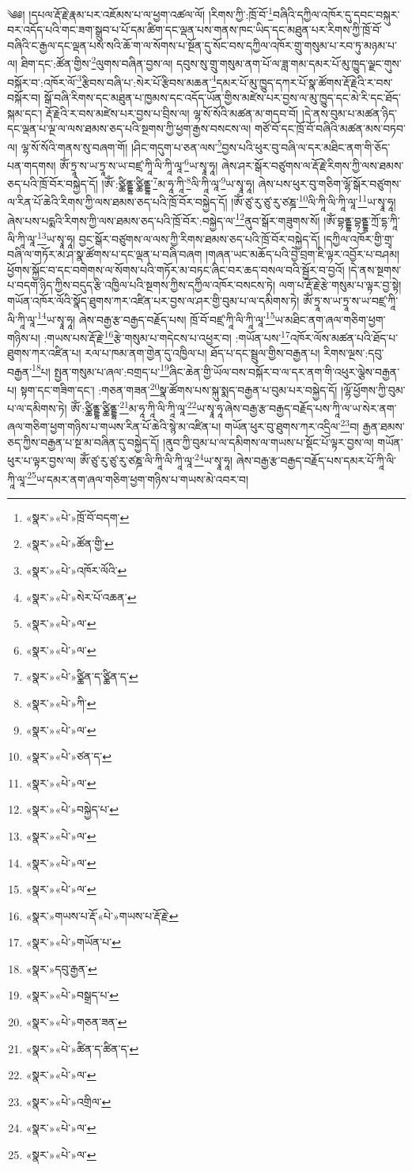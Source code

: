༄༅། །དཔལ་རྡོ་རྗེ་རྣམ་པར་འཇོམས་པ་ལ་ཕྱག་འཚལ་ལོ། །རིགས་ཀྱི་:ཁྲོ་བོ་\footnote{«སྣར་»«པེ་»ཁྲོ་བོ་བདག་}བཞིའི་དཀྱིལ་འཁོར་དུ་དབང་བསྐུར་བར་འདོད་པའི་གང་ཟག་སྒྲུབ་པ་པོ་དམ་ཚིག་དང་ལྡན་པས་གནས་ཁང་ཡིད་དང་མཐུན་པར་རིགས་ཀྱི་ཁྲོ་བོ་བཞིའི་ང་རྒྱལ་དང་ལྡན་པས་སའི་ཆོ་ག་ལ་སོགས་པ་སྔོན་དུ་སོང་བས་དཀྱིལ་འཁོར་གྲུ་གསུམ་པ་རབ་ཏུ་མཉམ་པ་ལ། ཐིག་དང་:ཚོན་གྱིས་\footnote{«སྣར་»«པེ་»ཚོན་གྱི་}ལུགས་བཞིན་བྱས་ལ། དབུས་སུ་གྲུ་གསུམ་ནག་པོ་ལ་ཟླ་གམ་དམར་པོ་མུ་ཁྱུད་ལྗང་གུས་བསྐོར་བ་:འཁོར་ལོ་\footnote{«སྣར་»«པེ་»འཁོར་ལོའི་}རྩིབས་བཞི་པ་:སེར་པོ་རྩིབས་མཆན་\footnote{«སྣར་»«པེ་»སེར་པོ་འཆན་}དམར་པོ་མུ་ཁྱུད་དཀར་པོ་སྣ་ཚོགས་རྡོ་རྗེའི་ར་བས་བསྐོར་བ། སྒོ་བཞི་རིགས་དང་མཐུན་པ་ཁྱམས་དང་འདོད་ཡོན་གྱིས་མཛེས་པར་བྱས་ལ་མུ་ཁྱུད་དང་མེ་རི་དང་ཐོད་སྐམ་དང་། རྡོ་རྗེའི་ར་བས་མཛེས་པར་བྱས་པ་བྲིས་ལ། ལྷ་སོ་སོའི་མཚན་མ་གདབ་བོ། །དེ་ནས་བུམ་པ་མཚན་ཉིད་དང་ལྡན་པ་ལྔ་ལ་ལས་ཐམས་ཅད་པའི་སྔགས་ཀྱི་ཕྱག་རྒྱས་བསངས་ལ། གཙོ་བོ་དང་ཁྲོ་བོ་བཞིའི་མཚན་མས་བཏབ་ལ། ལྷ་སོ་སོའི་གནས་སུ་བཞག་གོ། །ཤིང་གདུག་པ་ཅན་ལས་\footnote{«སྣར་»«པེ་»ལ་}བྱས་པའི་ཕུར་བུ་བཞི་ལ་དར་མཐིང་ནག་གི་ཅོད་པན་གདགས། ཨོཾ་ཏྲཱ་ས་ཡ་ཏྲཱ་ས་ཡ་བཛྲ་ཀཱི་ལི་ཀཱི་ལཱ་\footnote{«སྣར་»«པེ་»ལ་}ཡ་སྭཱ་ཧཱ། ཞེས་ཤར་སྒོར་བཙུགས་ལ་རྡོ་རྗེ་རིགས་ཀྱི་ལས་ཐམས་ཅད་པའི་ཁྲོ་བོར་བསྐྱེད་དོ། །ཨོཾ་:ཙྪིནྡྷ་ཙྪིནྡྷ་\footnote{«སྣར་»«པེ་»ཙྪིན་ད་ཙྪིན་ད་}མ་ཧཱ་ཀཱི་\footnote{«སྣར་»«པེ་»ཀི་}ལི་ཀཱི་ལཱ་\footnote{«སྣར་»«པེ་»ལ་}ཡ་སྭཱ་ཧཱ། ཞེས་པས་ཕུར་བུ་གཅིག་ལྷོ་སྒོར་བཙུགས་ལ་རིན་པོ་ཆེའི་རིགས་ཀྱི་ལས་ཐམས་ཅད་པའི་ཁྲོ་བོར་བསྐྱེད་དོ། །ཨོཾ་ཙུ་རུ་ཙུ་རུ་ཙཎྜ་\footnote{«སྣར་»«པེ་»ཙན་ད་}ལི་ཀཱི་ལི་ཀཱི་ལཱ་\footnote{«སྣར་»«པེ་»ལ་}ཡ་སྭཱ་ཧཱ། ཞེས་པས་པདྨའི་རིགས་ཀྱི་ལས་ཐམས་ཅད་པའི་ཁྲོ་བོར་:བསྐྱེད་ལ་\footnote{«སྣར་»«པེ་»བསྐྱེད་པ་}ནུབ་སྒོར་གཟུགས་སོ། །ཨོཾ་བྷནྡྷ་བྷནྡྷ་ཀྲོ་དྷ་ཀཱི་ལི་ཀཱི་ལཱ་\footnote{«སྣར་»«པེ་»ལ་}ཡ་སྭཱ་ཧཱ། བྱང་སྒོར་བཙུགས་ལ་ལས་ཀྱི་རིགས་ཐམས་ཅད་པའི་ཁྲོ་བོར་བསྐྱེད་དོ། །དཀྱིལ་འཁོར་གྱི་གྲྭ་བཞི་ལ་གཏོར་མ་ཤ་སྣ་ཚོགས་པ་དང་ལྡན་པ་བཞི་བཞག །གཞན་ཡང་མཆོད་པའི་བྱེ་བྲག་ཇི་ལྟར་འབྱོར་པ་བཤམ། ཕྱོགས་སྐྱོང་བ་དང་བགེགས་ལ་སོགས་པའི་གཏོར་མ་བཏང་ཞིང་བར་ཆད་བསལ་བའི་སྦྱོར་བ་བྱའོ། །དེ་ནས་སྔགས་པ་བདག་ཉིད་ཀྱིས་བདུད་རྩི་འཁྱིལ་པའི་སྔགས་ཀྱིས་དཀྱིལ་འཁོར་བསངས་ཏེ། ལག་པ་རྡོ་རྗེ་རྩེ་གསུམ་པ་ལྟར་བྱ་སྟེ། གཡོན་འཁོར་ལོའི་སྣོད་ཐུགས་ཀར་འཛིན་པར་བྱས་ལ་ཤར་གྱི་བུམ་པ་ལ་དམིགས་ཏེ། ཨོཾ་ཏྲཱ་ས་ཡ་ཏྲཱ་ས་ཡ་བཛྲ་ཀཱི་ལི་ཀཱི་ལཱ་\footnote{«སྣར་»«པེ་»ལ་}ཡ་སྭཱ་ཧཱ། ཞེས་བརྒྱ་རྩ་བརྒྱད་བརྗོད་པས། ཁྲོ་བོ་བཛྲ་ཀཱི་ལི་ཀཱི་ལཱ་\footnote{«སྣར་»«པེ་»ལ་}ཡ་མཐིང་ནག་ཞལ་གཅིག་ཕྱག་གཉིས་པ། :གཡས་པས་རྡོ་རྗེ་\footnote{«སྣར་»གཡས་པ་རྡོ་«པེ་»གཡས་པ་རྡོ་རྗེ་}རྩེ་གསུམ་པ་གདེངས་པ་འཕྱར་བ། :གཡོན་པས་\footnote{«སྣར་»«པེ་»གཡོན་པ་}འཁོར་ལོས་མཚན་པའི་ཐོད་པ་ཐུགས་ཀར་འཛིན་པ། རལ་པ་ཁམ་ནག་གྱེན་དུ་འཁྱིལ་པ། ཐོད་པ་དང་སྦྲུལ་གྱིས་བརྒྱན་པ། རིགས་ལྔས་:དབུ་བརྒྱན་\footnote{«སྣར་»དབུ་རྒྱན་}པ། སྤྱན་གསུམ་པ་ཞལ་:བགྲད་པ་\footnote{«སྣར་»«པེ་»བསྒྲད་པ་}ཞིང་ཆེན་གྱི་ཡོལ་བས་བསྐོར་བ་ལ་དར་ནག་གི་འཕུར་ལྕེས་བརྒྱན་པ། སྟག་དང་གཟིག་དང་། :གཅན་གཟན་\footnote{«སྣར་»«པེ་»གཅན་ཟན་}སྣ་ཚོགས་པས་སྐུ་སྨད་བརྒྱན་པ་བུམ་པར་བསྐྱེད་དོ། །ལྷོ་ཕྱོགས་ཀྱི་བུམ་པ་ལ་དམིགས་ཏེ། ཨོཾ་:ཙྪིནྡྷ་ཙྪིནྡྷ་\footnote{«སྣར་»«པེ་»ཚིན་ད་ཚིན་ད་}མ་ཧཱ་ཀཱི་ལི་ཀཱི་ལཱ་\footnote{«སྣར་»«པེ་»ལ་}ཡ་སྭཱ་ཧཱ་ཞེས་བརྒྱ་རྩ་བརྒྱད་བརྗོད་པས་ཀཱི་ལ་ཡ་སེར་ནག་ཞལ་གཅིག་ཕྱག་གཉིས་པ་གཡས་རིན་པོ་ཆེའི་སྙེ་མ་འཛིན་པ། གཡོན་ཕུར་བུ་ཐུགས་ཀར་འདྲིལ་\footnote{«སྣར་»«པེ་»འགྲིལ་}བ། རྒྱན་ཐམས་ཅད་ཀྱིས་བརྒྱན་པ་སྔ་མ་བཞིན་དུ་བསྐྱེད་དོ། །ནུབ་ཀྱི་བུམ་པ་ལ་དམིགས་ལ་གཡས་པ་སྡོང་པོ་ལྟར་བྱས་ལ། གཡོན་ཕུར་པ་ལྟར་བྱས་ལ། ཨོཾ་ཙུ་རུ་ཙུ་རུ་ཙཎྜ་ལི་ཀཱི་ལི་ཀཱི་ལཱ་\footnote{«སྣར་»«པེ་»ལ་}ཡ་སྭཱ་ཧཱ། ཞེས་བརྒྱ་རྩ་བརྒྱད་བརྗོད་པས་དམར་པོ་ཀཱི་ལི་ཀཱི་ལཱ་\footnote{«སྣར་»«པེ་»ལ་}ཡ་དམར་ནག་ཞལ་གཅིག་ཕྱག་གཉིས་པ་གཡས་མེ་འབར་བ། 